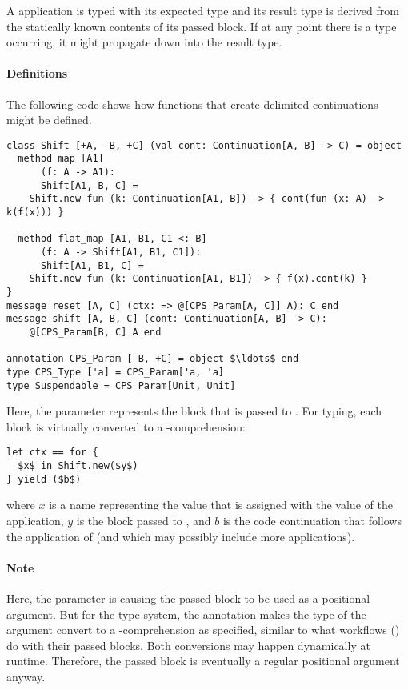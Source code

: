 A  application is typed with its expected type and its result type is derived from the statically known contents of its passed block. If at any point there is a  type occurring, it might propagate down into the result type. 

\paragraph{Definitions}
The following code shows how functions that create delimited continuations might be defined. 
\begin{lstlisting}
class Shift [+A, -B, +C] (val cont: Continuation[A, B] -> C) = object
  method map [A1] 
      (f: A -> A1): 
      Shift[A1, B, C] =
    Shift.new fun (k: Continuation[A1, B]) -> { cont(fun (x: A) -> k(f(x))) }

  method flat_map [A1, B1, C1 <: B] 
      (f: A -> Shift[A1, B1, C1]): 
      Shift[A1, B1, C] = 
    Shift.new fun (k: Continuation[A1, B1]) -> { f(x).cont(k) }
}
message reset [A, C] (ctx: => @[CPS_Param[A, C]] A): C end
message shift [A, B, C] (cont: Continuation[A, B] -> C): 
    @[CPS_Param[B, C] A end

annotation CPS_Param [-B, +C] = object $\ldots$ end
type CPS_Type ['a] = CPS_Param['a, 'a]
type Suspendable = CPS_Param[Unit, Unit]
\end{lstlisting}

Here, the  parameter represents the block that is passed to . For typing, each  block is virtually converted to a -comprehension:
\begin{lstlisting}
let ctx == for {
  $x$ in Shift.new($y$)
} yield ($b$)
\end{lstlisting}
where $x$ is a name representing the value that is assigned with the value of the  application, $y$ is the block passed to , and $b$ is the code continuation that follows the application of  (and which may possibly include more  applications). 

\paragraph{Note}
Here, the  parameter is causing the passed block to be used as a positional argument. But for the type system, the annotation  makes the type of the argument convert to a -comprehension as specified, similar to what workflows () do with their passed blocks. Both conversions may happen dynamically at runtime. Therefore, the passed block is eventually a regular positional argument anyway. 

